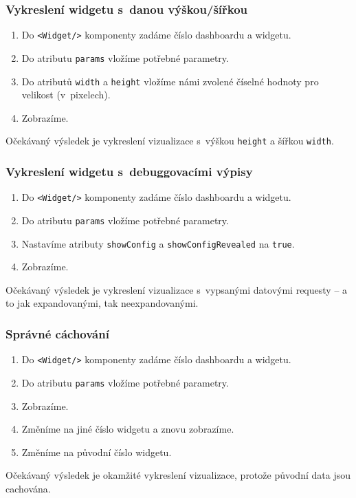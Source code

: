 \documentclass[czech, bc, kiv, he, iso690numb]{fasthesis}
\begin{document}
\subsubsection{Vykreslení widgetu s~danou výškou/šířkou}
\begin{enumerate}
	\item Do \texttt{<Widget/>} komponenty zadáme číslo dashboardu a widgetu.
	\item Do atributu \texttt{params} vložíme potřebné parametry.
	\item Do atributů \texttt{width} a \texttt{height} vložíme námi zvolené číselné hodnoty pro velikost (v~pixelech).
	\item Zobrazíme.
\end{enumerate}
Očekávaný výsledek je vykreslení vizualizace s~výškou \texttt{height} a šířkou \texttt{width}.

\subsubsection{Vykreslení widgetu s~debuggovacími výpisy}
\begin{enumerate}
	\item Do \texttt{<Widget/>} komponenty zadáme číslo dashboardu a widgetu.
	\item Do atributu \texttt{params} vložíme potřebné parametry.
	\item Nastavíme atributy \texttt{showConfig} a \texttt{showConfigRevealed} na \texttt{true}.
	\item Zobrazíme.
\end{enumerate}
Očekávaný výsledek je vykreslení vizualizace s~vypsanými datovými requesty – a to jak expandovanými, tak neexpandovanými.

\subsubsection{Správné cáchování}
\begin{enumerate}
	\item Do \texttt{<Widget/>} komponenty zadáme číslo dashboardu a widgetu.
	\item Do atributu \texttt{params} vložíme potřebné parametry.
	\item Zobrazíme.
	\item Změníme na jiné číslo widgetu a znovu zobrazíme.
	\item Změníme na původní číslo widgetu.
\end{enumerate}
Očekávaný výsledek je okamžité vykreslení vizualizace, protože původní data jsou cachována.
\end{document}
